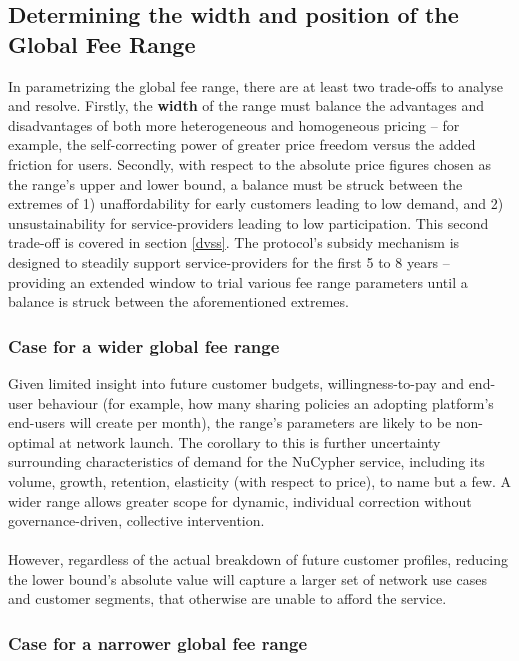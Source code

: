 \documentclass[longbibliography,nofootinbib]{revtex4-1}
\begin{document}
\subsection{Determining the width and position of the Global Fee Range}

In parametrizing the global fee range, there are at least two trade-offs to analyse and resolve. Firstly, the \textbf{width} of the range must balance the advantages and disadvantages of both more heterogeneous and homogeneous pricing – for example, the self-correcting power of greater price freedom versus the added friction for users. Secondly, with respect to the absolute price figures chosen as the range's upper and lower bound, a balance must be struck between the extremes of 1) unaffordability for early customers leading to low demand, and 2) unsustainability for service-providers leading to low participation. This second trade-off is covered in section \ref{dvss}. The protocol's subsidy mechanism is designed to steadily support service-providers for the first 5 to 8 years – providing an extended window to trial various fee range parameters until a balance is struck between the aforementioned extremes. 

\subsubsection{Case for a wider global fee range}

Given limited insight into future customer budgets, willingness-to-pay and end-user behaviour (for example, how many sharing policies an adopting platform's end-users will create per month), the range's parameters are likely to be non-optimal at network launch. The corollary to this is further uncertainty surrounding characteristics of demand for the NuCypher service, including its volume, growth, retention, elasticity (with respect to price), to name but a few. A wider range allows greater scope for dynamic, individual correction without governance-driven, collective intervention.
\\\\
However, regardless of the actual breakdown of future customer profiles, reducing the lower bound’s absolute value will capture a larger set of network use cases and customer segments, that otherwise are unable to afford the service. 

\subsubsection{Case for a narrower global fee range}
\end{document}
